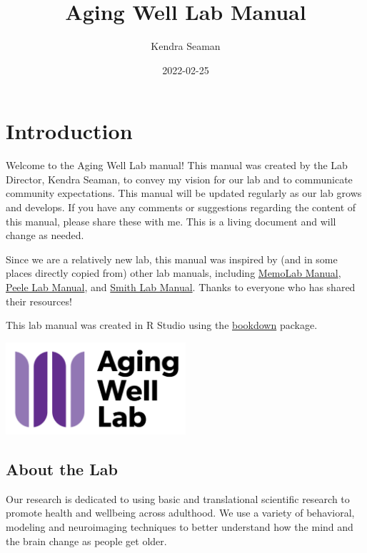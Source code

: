 \documentclass[
]{book}
\title{Aging Well Lab Manual}
\author{Kendra Seaman}
\date{2022-02-25}
\begin{document}
\maketitle

{
\setcounter{tocdepth}{1}
\tableofcontents
}
\hypertarget{introduction}{%
\chapter{Introduction}\label{introduction}}

Welcome to the Aging Well Lab manual! This manual was created by the Lab Director, Kendra Seaman, to convey my vision for our lab and to communicate community expectations. This manual will be updated regularly as our lab grows and develops. If you have any comments or suggestions regarding the content of this manual, please share these with me. This is a living document and will change as needed.

Since we are a relatively new lab, this manual was inspired by (and in some places directly copied from) other lab manuals, including \href{https://github.com/memobc/memolab-manual}{MemoLab Manual}, \href{http://jpeelle.net/peellelab_manual.pdf}{Peele Lab Manual}, and \href{https://github.com/DVSneuro/smithlab_manual/blob/master/SmithLab_manual.pdf}{Smith Lab Manual}. Thanks to everyone who has shared their resources!

This lab manual was created in R Studio using the \href{https://bookdown.org/yihui/bookdown/}{bookdown} package.

\includegraphics[width=0.5\textwidth,height=\textheight]{images/awl.png}

\hypertarget{about-the-lab}{%
\section{About the Lab}\label{about-the-lab}}

Our research is dedicated to using basic and translational scientific research to promote health and wellbeing across adulthood. We use a variety of behavioral, modeling and neuroimaging techniques to better understand how the mind and the brain change as people get older.
\end{document}
